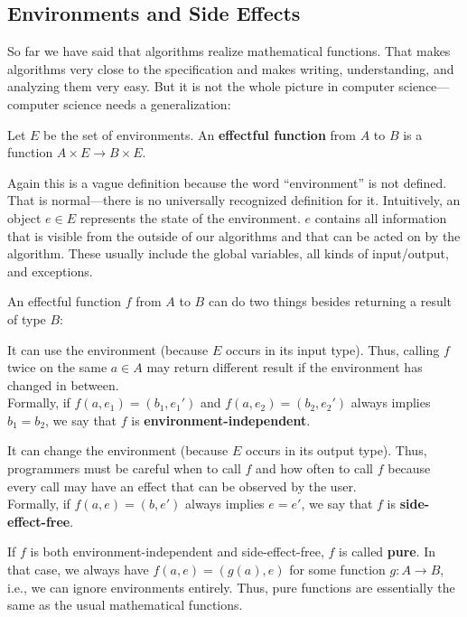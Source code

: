 \subsection{Environments and Side Effects}

So far we have said that algorithms realize mathematical functions.
That makes algorithms very close to the specification and makes writing, understanding, and analyzing them very easy.
But it is not the whole picture in computer science---computer science needs a generalization:

\begin{definition}
Let $E$ be the set of environments.
An \textbf{effectful function} from $A$ to $B$ is a function $A\times E\to B\times E$.
\end{definition}

Again this is a vague definition because the word ``environment'' is not defined.
That is normal---there is no universally recognized definition for it.
Intuitively, an object $e\in E$ represents the state of the environment.
$e$ contains all information that is visible from the outside of our algorithms and that can be acted on by the algorithm.
These usually include the global variables, all kinds of input/output, and exceptions.

An effectful function $f$ from $A$ to $B$ can do two things besides returning a result of type $B$:
\begin{compactitem}
 \item It can use the environment (because $E$ occurs in its input type).
   Thus, calling $f$ twice on the same $a\in A$ may return different result if the environment has changed in between.\\
   Formally, if $f(a,e_1)=(b_1,e_1')$ and $f(a,e_2)=(b_2,e_2')$ always implies $b_1=b_2$, we say that $f$ is \textbf{environment-independent}.
 \item It can change the environment (because $E$ occurs in its output type).
   Thus, programmers must be careful when to call $f$ and how often to call $f$ because every call may have an effect that can be observed by the user.\\
   Formally, if $f(a,e)=(b,e')$ always implies $e=e'$, we say that $f$ is \textbf{side-effect-free}.
\end{compactitem}
If $f$ is both environment-independent and side-effect-free, $f$ is called \textbf{pure}.
In that case, we always have $f(a,e)=(g(a),e)$ for some function $g:A\to B$, i.e., we can ignore environments entirely.
Thus, pure functions are essentially the same as the usual mathematical functions.

